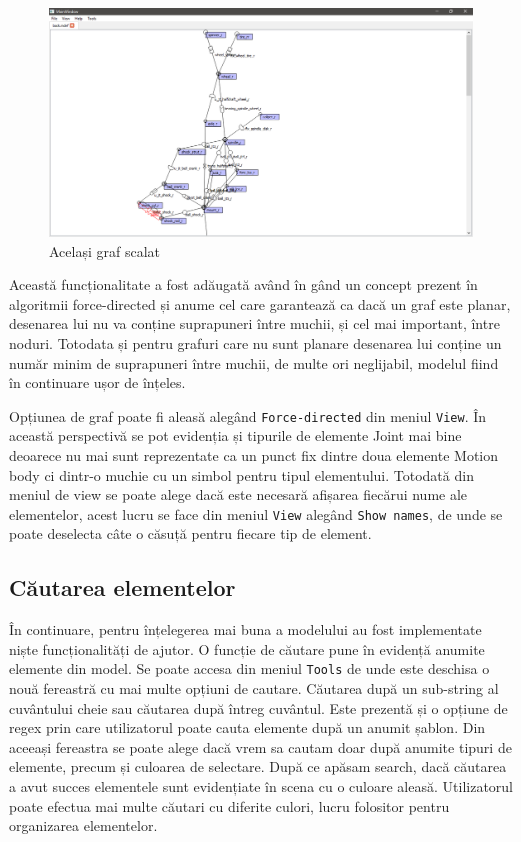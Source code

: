 \begin{figure}[H]
    \includegraphics[width=\linewidth]{imagini/implementare/grafzoom.png}
    \caption{Același graf scalat}
    \label{fig:tabs}
\end{figure}

Această funcționalitate a fost adăugată având în gând un concept prezent în algoritmii force-directed și anume cel care garantează ca dacă un graf este planar, desenarea 
lui nu va conține suprapuneri între muchii, și cel mai important, între noduri. Totodata și pentru grafuri care nu sunt planare desenarea 
lui conține un număr minim de suprapuneri între muchii, de multe ori neglijabil, modelul fiind în continuare ușor de înțeles.\newline

Opțiunea de graf poate fi aleasă alegând \verb|Force-directed| din meniul \verb|View|. În această perspectivă se pot evidenția și tipurile de elemente Joint mai bine deoarece nu mai 
sunt reprezentate ca un punct fix dintre doua elemente Motion body ci dintr-o muchie cu un simbol pentru tipul elementului. 
Totodată din meniul de view se poate alege dacă este necesară afișarea fiecărui nume ale elementelor, acest lucru se face din meniul \verb|View| alegând \verb|Show names|, 
de unde se poate deselecta câte o căsuță pentru fiecare tip de element.\newline 


\subsection{Căutarea elementelor}
În continuare, pentru înțelegerea mai buna a modelului au fost implementate niște funcționalități de ajutor. 
O funcție de căutare pune în evidență anumite elemente din model. Se poate accesa din meniul \verb|Tools| de unde este deschisa o nouă fereastră cu mai multe opțiuni de cautare. 
Căutarea după un sub-string al cuvântului cheie sau căutarea după întreg cuvântul. Este prezentă și o opțiune de regex prin care utilizatorul poate 
cauta elemente după un anumit șablon. Din aceeași fereastra se poate alege dacă vrem sa cautam doar după anumite tipuri 
de elemente, precum și culoarea de selectare. După ce apăsam search, dacă căutarea a avut succes elementele sunt evidențiate în scena cu o culoare aleasă.
Utilizatorul poate efectua mai multe căutari cu diferite culori, lucru folositor pentru organizarea elementelor. 

